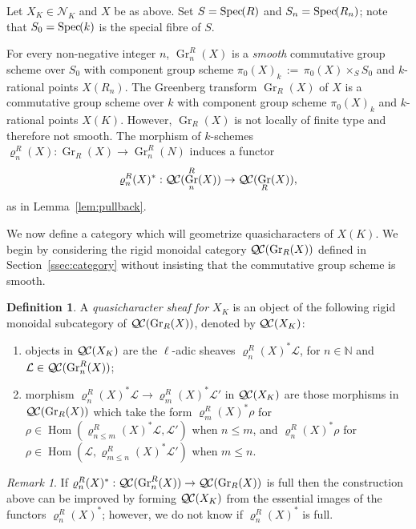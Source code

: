 \documentclass[CM,Submssn,SecEq]{degruyter-crelle} %
\theoremstyle{plain}
\theoremstyle{definition}
\newtheorem{definition}[theorem]{Definition}
\theoremstyle{remark}
\newtheorem{remark}[theorem]{Remark}
\newcommand{\NN}{{\mathbb{N}}}
\newcommand{\Fq}{k}
\DeclareMathOperator{\Hom}{Hom}
\DeclareMathOperator{\Gr}{Gr}
\newcommand{\Spec}[1]{{\operatorname{Spec}\hskip-1pt( #1 )}}
\newcommand{\ceq}{{\, :=\, }}
\newcommand{\qcs}[1]{{\mathcal{#1}}}
\newcommand{\QC}{{\mathcal{Q\hskip-0.8pt C}}}
\begin{document}
Let $X_K \in \mathcal{N}_K$ and $X$ be as above.
Set $S = \Spec{R}$ and $S_n = \Spec{R_n}$;
note that $S_0 = \Spec{\Fq}$ is the special fibre of $S$.

For every non-negative integer $n$, $\Gr^R_n(X)$ is a {\it smooth} commutative group scheme over $S_0$
with component group scheme $\pi_0(X)_{\Fq} \ceq \pi_0(X) \times_S S_0$ and $\Fq$-rational points $X(R_n).$
%
The Greenberg transform $\Gr_R(X)$ of $X$ is a commutative group scheme over $\Fq$
with component group scheme $\pi_0(X)_{\Fq}$
and $\Fq$-rational points $X(K).$
However, $\Gr_R(X)$ is not locally of finite type and therefore not smooth.
%
The morphism of $\Fq$-schemes $\varrho^R_n(X) : \Gr_R(X) \to \Gr^R_n(N)$ induces a functor
\[
\varrho^R_n(X)^* : \QC(\Gr^R_n(X)) \to \QC(\Gr_R(X)),
\]
as in Lemma~\ref{lem:pullback}.

We now define a category which will geometrize quasicharacters of $X(K)$.
We begin by considering the rigid monoidal category $\QC(\Gr_R(X))$ defined in Section~\ref{ssec:category} without insisting that the commutative group scheme is smooth.

\begin{definition}
A {\it quasicharacter sheaf for $X_K$} is an object of
the following rigid monoidal subcategory of $\QC(\Gr_R(X))$, denoted by $\QC(X_K)$:
\begin{enumerate}
\item
objects in $\QC(X_K)$ are the $\ell$-adic sheaves $\varrho^R_n(X)^*\qcs{L}$, for $n\in \NN$ and $\qcs{L} \in \QC(\Gr^R_n(X))$; 
\item
morphism $\varrho^R_n(X)^*\qcs{L} \to \varrho^R_m(X)^*\qcs{L}'$ in $\QC(X_K)$ are those morphisms in $\QC(\Gr_R(X))$ which take the form $\varrho^R_m(X)^*\rho$ for $\rho \in \Hom(\varrho^R_{n\leq m}(X)^*\qcs{L},\qcs{L}')$ when $n\leq m$, and $\varrho^R_n(X)^*\rho$ for $\rho \in \Hom(\qcs{L},\varrho^R_{m\leq n}(X)^*\qcs{L}')$ when $m\leq n$.
\end{enumerate}

\end{definition}


\begin{remark}
If $\varrho^R_n(X)^* : \QC(\Gr^R_n(X)) \to \QC(\Gr_R(X))$ is full then the construction above can be improved by forming $\QC(X_K)$ from the essential images of the functors $\varrho^R_n(X)^*$; however, we do not know if $\varrho^R_n(X)^*$ is full.
\end{remark}
\end{document}
